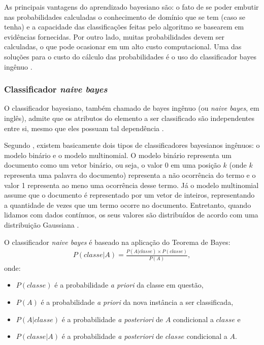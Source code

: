 As principais vantagens do aprendizado bayesiano são: o fato de se poder embutir nas probabilidades calculadas o conhecimento de domínio que se tem (caso se tenha) e a capacidade das classificações feitas pelo algoritmo se basearem em evidências fornecidas. Por outro lado, muitas probabilidades devem ser calculadas, o que pode ocasionar em um alto custo computacional. Uma das soluções para o custo do cálculo das probabilidades é o uso do classificador bayes ingênuo \cite{pardo2002}.

\subsubsection{Classificador \textit{naive bayes}}

O classificador bayesiano, também chamado de bayes ingênuo (ou \textit{naive bayes}, em inglês), admite que os atributos do elemento a ser classificado são independentes entre si, mesmo que eles possuam tal dependência \cite{pellucci2011}.

Segundo , existem basicamente dois tipos de classificadores bayesianos ingênuos: o modelo binário e o modelo multinomial. O modelo binário representa um documento como um vetor binário, ou seja, o valor 0 em uma posição \(k\) (onde \(k\) representa uma palavra do documento) representa a não ocorrência do termo e o valor 1 representa ao meno uma ocorrência desse termo. Já o modelo multinomial assume que o documento é representado por um vetor de inteiros, representando a quantidade de vezes que um termo ocorre no documento. Entretanto, quando lidamos com dados contínuos, os seus valores são distribuídos de acordo com uma distribuição Gaussiana \cite{hand2001}.

O classificador \textit{naive bayes} é baseado na aplicação do Teorema de Bayes:
%
\begin{align}
P(classe|A) = \frac{P(A|classe) \times P(classe)}{P(A)},
\end{align}
%
onde:

\begin{itemize}
    \item \(P(classe)\) é a probabilidade \textit{a priori} da classe em questão,
    \item \(P(A)\) é a probabilidade \textit{a priori} da nova instância a ser classificada,
    \item \(P(A|classe)\) é a probabilidade \textit{a posteriori} de \(A\) condicional a \(classe\) e
    \item \(P(classe|A)\) é a probabilidade \textit{a posteriori} de \(classe\) condicional a \(A\).
\end{itemize}

